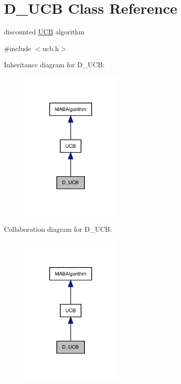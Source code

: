 \hypertarget{class_d___u_c_b}{}\section{D\+\_\+\+U\+CB Class Reference}
\label{class_d___u_c_b}


discounted \mbox{\hyperlink{class_u_c_b}{U\+CB}} algorithm  




{\ttfamily \#include $<$ucb.\+h$>$}



Inheritance diagram for D\+\_\+\+U\+CB\+:
\nopagebreak
\begin{figure}[H]
\begin{center}
\leavevmode
\includegraphics[width=144pt]{class_d___u_c_b__inherit__graph}
\end{center}
\end{figure}


Collaboration diagram for D\+\_\+\+U\+CB\+:
\nopagebreak
\begin{figure}[H]
\begin{center}
\leavevmode
\includegraphics[width=144pt]{class_d___u_c_b__coll__graph}
\end{center}
\end{figure}
